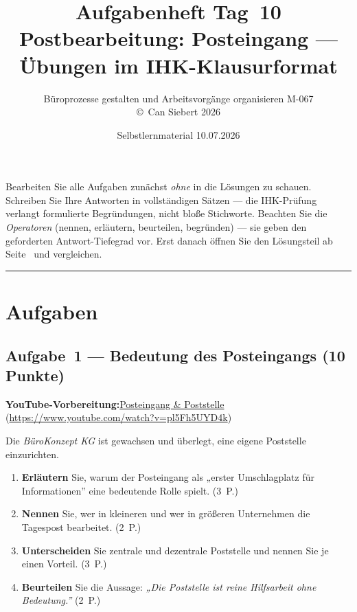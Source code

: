\documentclass[11pt, a4paper]{article}
\title{\vspace*{-1.5cm}\Huge\bfseries\color{bfwPrimaryDark}Aufgabenheft Tag~10\\[0.4em]
  \large\color{bfwInkSoft}\textnormal{Postbearbeitung: Posteingang --- Übungen im IHK-Klausurformat}}
\author{\textsf{Büroprozesse gestalten und Arbeitsvorgänge organisieren \textperiodcentered{} M-067}\\
\textsf{\small\copyright\ Can Siebert\,\textperiodcentered\,2026}}
\date{Selbstlernmaterial \textperiodcentered{} 10.07.2026}
\begin{document}
\maketitle
\thispagestyle{empty}

\begin{merksatz}[title={\bfseries So nutzen Sie dieses Aufgabenheft}]
Bearbeiten Sie alle Aufgaben zunächst \emph{ohne} in die Lösungen zu schauen. Schreiben
Sie Ihre Antworten in vollständigen Sätzen --- die IHK-Prüfung verlangt formulierte
Begründungen, nicht bloße Stichworte. Beachten Sie die \emph{Operatoren} (nennen,
erläutern, beurteilen, begründen) --- sie geben den geforderten Antwort-Tiefegrad vor.
Erst danach öffnen Sie den Lösungsteil ab Seite~\pageref{loesungen} und vergleichen.
\end{merksatz}

\tableofcontents
\vspace{1em}
\hrule

\section{Aufgaben}

\subsection*{Aufgabe~1 --- Bedeutung des Posteingangs (10 Punkte)}

\noindent\textbf{\color{bfwAccent}YouTube-Vorbereitung:}\enspace \href{https://www.youtube.com/watch?v=pl5Fh5UYD4k}{Posteingang \& Poststelle} (\url{https://www.youtube.com/watch?v=pl5Fh5UYD4k})

\medskip
Die \emph{BüroKonzept KG} ist gewachsen und überlegt, eine eigene Poststelle einzurichten.

\begin{enumerate}[label=(\alph*)]
  \item \textbf{Erläutern} Sie, warum der Posteingang als „erster Umschlagplatz für Informationen” eine bedeutende Rolle spielt. \hfill (3~P.)
  \item \textbf{Nennen} Sie, wer in kleineren und wer in größeren Unternehmen die Tagespost bearbeitet. \hfill (2~P.)
  \item \textbf{Unterscheiden} Sie zentrale und dezentrale Poststelle und nennen Sie je einen Vorteil. \hfill (3~P.)
  \item \textbf{Beurteilen} Sie die Aussage: \emph{„Die Poststelle ist reine Hilfsarbeit ohne Bedeutung.”} \hfill (2~P.)
\end{enumerate}
\end{document}

